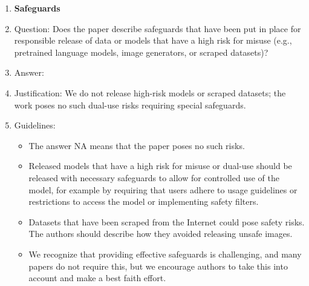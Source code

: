 \documentclass{article}
\begin{document}
\begin{enumerate}
\item {\bf Safeguards}
    \item[] Question: Does the paper describe safeguards that have been put in place for responsible release of data or models that have a high risk for misuse (e.g., pretrained language models, image generators, or scraped datasets)?
    \item[] Answer: \answerNA{}
    \item[] Justification: We do not release high-risk models or scraped datasets; the work poses no such dual-use risks requiring special safeguards.
    \item[] Guidelines:
    \begin{itemize}
        \item The answer NA means that the paper poses no such risks.
        \item Released models that have a high risk for misuse or dual-use should be released with necessary safeguards to allow for controlled use of the model, for example by requiring that users adhere to usage guidelines or restrictions to access the model or implementing safety filters. 
        \item Datasets that have been scraped from the Internet could pose safety risks. The authors should describe how they avoided releasing unsafe images.
        \item We recognize that providing effective safeguards is challenging, and many papers do not require this, but we encourage authors to take this into account and make a best faith effort.
    \end{itemize}


\end{enumerate}
\end{document}
